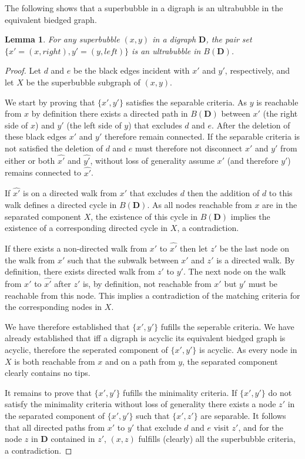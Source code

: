 \documentclass[11pt]{ucthesis}
\newtheorem{lemma}{Lemma}
\newtheorem*{proof}{Proof}
\begin{document}
The following shows that a superbubble in a digraph is an ultrabubble in the equivalent biedged graph.

\begin{lemma}
For any superbubble $(x, y)$ in a digraph $\textbf{D}$, the pair set $\{ x'=(x, right), y'=(y, left) \}$ is an ultrabubble in $B(\textbf{D})$.
\label{lemma_super_bubble_is_ultra_bubble}
\end{lemma}
\begin{proof}
Let $d$ and $e$ be the black edges incident with $x'$ and $y'$, respectively, and let $X$ be the superbubble subgraph of $(x, y)$.

We start by proving that $\{ x', y' \}$ satisfies the separable criteria. 
As $y$ is reachable from $x$ by definition there exists a directed path in $B(\textbf{D})$ between $x'$ (the right side of $x$) and $y'$ (the left side of $y$) that excludes $d$ and $e$. After the deletion of these black edges $x'$ and $y'$ therefore remain connected.
If the separable criteria is not satisfied the deletion of $d$ and $e$ must therefore not disconnect $x'$ and $y'$ from either or both $\hat{x'}$ and $\hat{y'}$, without loss of generality assume $x'$ (and therefore $y'$) remains connected to $\hat{x'}$. 

If $\hat{x'}$ is on a directed walk from $x'$ that excludes $d$ then the addition of $d$ to this walk defines a directed cycle in $B(\textbf{D})$. As all nodes reachable from $x$ are in the separated component $X$, the existence of this cycle in $B(\textbf{D})$ implies the existence of a corresponding directed cycle in $X$, a contradiction.

If there exists a non-directed walk from $x'$ to $\hat{x'}$ then let $z'$ be the last node on the walk from $x'$ such that the subwalk between $x'$ and $z'$ is a directed walk. By definition, there exists directed walk from $z'$ to $y'$. The next node on the walk from $x'$ to $\hat{x'}$ after $z'$ is, by definition, not reachable from $x'$ but $y'$ must be reachable from this node. This implies a contradiction of the matching criteria for the corresponding nodes in $X$.

We have therefore established that $\{ x', y' \}$ fufills the seperable criteria. We have already established that iff a digraph is acyclic its equivalent biedged graph is acyclic, therefore the seperated component of $\{ x', y' \}$ is acyclic. As every node in $X$ is both reachable from $x$ and on a path from $y$, the separated component clearly contains no tips. 

It remains to prove that $\{ x', y' \}$ fufills the minimality criteria. If $\{ x', y' \}$ do not satisfy the minimality criteria without loss of generality there exists a node $z'$ in the separated component of $\{x', y'\}$ such that $\{x', z' \}$ are separable. It follows that all directed paths from $x'$ to $y'$ that exclude $d$ and $e$ visit $z'$, and for the node $z$ in $\textbf{D}$ contained in $z'$, $(x, z)$ fulfills (clearly) all the superbubble criteria, a contradiction.

\end{proof}
\end{document}
